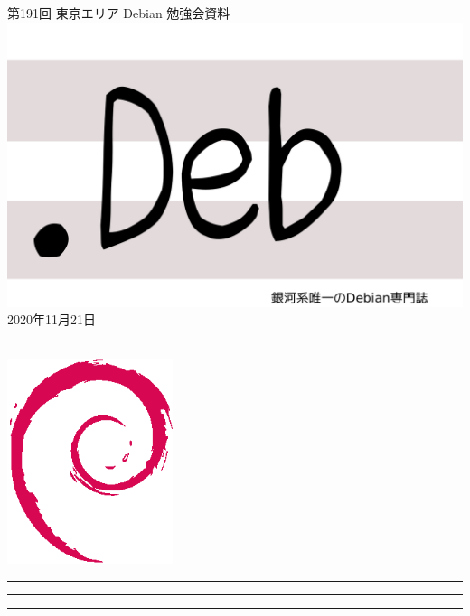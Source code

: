 \documentclass[mingoth,a4paper]{jsarticle}
\newcommand{\debmtgyear}{2020}
\newcommand{\debmtgmonth}{11}
\newcommand{\debmtgdate}{21}
\newcommand{\debmtgnumber}{191}
\begin{document}
\begin{titlepage}
\thispagestyle{empty}

\vspace*{-2cm}
第\debmtgnumber{}回 東京エリア Debian 勉強会資料\\
\hspace*{-2cm}
\includegraphics{image2012-natsu/dotdeb.pdf}\\
\hfill{}\debmtgyear{}年\debmtgmonth{}月\debmtgdate{}日

\\

\vspace*{-2cm}
\hfill{}\includegraphics[height=6cm]{image200502/openlogo-nd.eps}
\end{titlepage}

\newpage

\begin{minipage}[b]{0.2\hsize}
 \colorbox{titleback}{}
\end{minipage}
\begin{minipage}[b]{0.8\hsize}
\hrule
\vspace{2mm}
\hrule
\begin{multicols}{2}
\tableofcontents
\end{multicols}
\vspace{2mm}
\hrule
\end{minipage}
\end{document}
